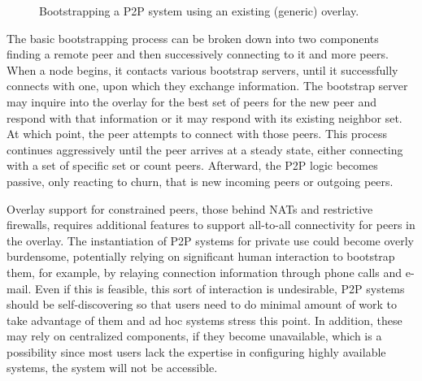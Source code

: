 \documentclass[conference]{IEEEtran}
\begin{document}
\begin{figure*}[h!t!]
\centering
{}
\caption{Bootstrapping a P2P system using an existing (generic) overlay.}
\label{fig:bootstrap}
\end{figure*}

The basic bootstrapping process can be broken down into two components finding
a remote peer and then successively connecting to it and more peers.  When a
node begins, it contacts various bootstrap servers, until it successfully
connects with one, upon which they exchange information.  The bootstrap server
may inquire into the overlay for the best set of peers for the new peer and
respond with that information or it may respond with its existing neighbor set.
At which point, the peer attempts to connect with those peers.  This process
continues aggressively until the peer arrives at a steady state, either
connecting with a set of specific set or count peers.  Afterward, the P2P logic
becomes passive, only reacting to churn, that is new incoming peers or outgoing
peers.

Overlay support for constrained peers, those behind NATs and restrictive
firewalls, requires additional features to support all-to-all connectivity for
peers in the overlay.  The instantiation of P2P systems for private use could
become overly burdensome, potentially relying on significant human interaction
to bootstrap them, for example, by relaying connection information through
phone calls and e-mail.  Even if this is feasible, this sort of interaction is
undesirable, P2P systems should be self-discovering so that users need to do
minimal amount of work to take advantage of them and ad hoc systems stress this
point.  In addition, these may rely on centralized components, if they become
unavailable, which is a possibility since most users lack the expertise in
configuring highly available systems, the system will not be accessible.
\end{document}
